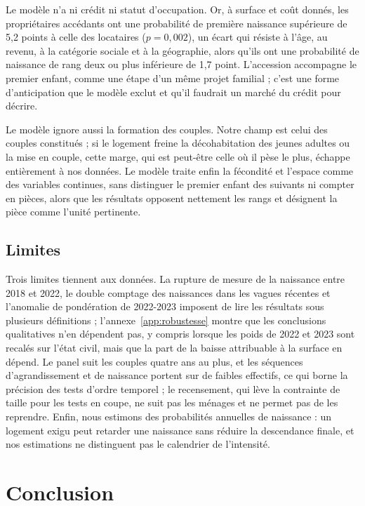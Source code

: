 \documentclass[11pt,a4paper]{article}
\theoremstyle{plain}
\theoremstyle{definition}
\theoremstyle{remark}
\begin{document}
Le modèle n'a ni crédit ni statut d'occupation. Or, à surface et coût donnés, les propriétaires accédants ont une probabilité de première naissance supérieure de 5,2 points à celle des locataires ($p = 0{,}002$), un écart qui résiste à l'âge, au revenu, à la catégorie sociale et à la géographie, alors qu'ils ont une probabilité de naissance de rang deux ou plus inférieure de 1,7 point. L'accession accompagne le premier enfant, comme une étape d'un même projet familial ; c'est une forme d'anticipation que le modèle exclut et qu'il faudrait un marché du crédit pour décrire.

Le modèle ignore aussi la formation des couples. Notre champ est celui des couples constitués ; si le logement freine la décohabitation des jeunes adultes ou la mise en couple, cette marge, qui est peut-être celle où il pèse le plus, échappe entièrement à nos données. Le modèle traite enfin la fécondité et l'espace comme des variables continues, sans distinguer le premier enfant des suivants ni compter en pièces, alors que les résultats opposent nettement les rangs et désignent la pièce comme l'unité pertinente.

\subsection{Limites}

Trois limites tiennent aux données. La rupture de mesure de la naissance entre 2018 et 2022, le double comptage des naissances dans les vagues récentes et l'anomalie de pondération de 2022-2023 imposent de lire les résultats sous plusieurs définitions ; l'annexe~\ref{app:robustesse} montre que les conclusions qualitatives n'en dépendent pas, y compris lorsque les poids de 2022 et 2023 sont recalés sur l'état civil, mais que la part de la baisse attribuable à la surface en dépend. Le panel suit les couples quatre ans au plus, et les séquences d'agrandissement et de naissance portent sur de faibles effectifs, ce qui borne la précision des tests d'ordre temporel ; le recensement, qui lève la contrainte de taille pour les tests en coupe, ne suit pas les ménages et ne permet pas de les reprendre. Enfin, nous estimons des probabilités annuelles de naissance : un logement exigu peut retarder une naissance sans réduire la descendance finale, et nos estimations ne distinguent pas le calendrier de l'intensité.

\section{Conclusion}
\end{document}
